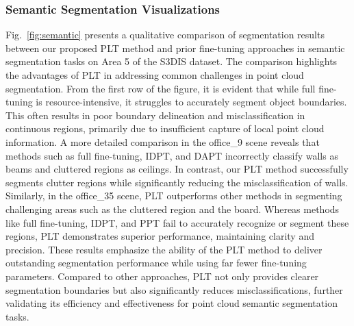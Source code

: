 \subsubsection{Semantic Segmentation Visualizations}  
Fig.~\ref{fig:semantic} presents a qualitative comparison of segmentation results between our proposed PLT method and prior fine-tuning approaches in semantic segmentation tasks on Area 5 of the S3DIS dataset. The comparison highlights the advantages of PLT in addressing common challenges in point cloud segmentation. From the first row of the figure, it is evident that while full fine-tuning is resource-intensive, it struggles to accurately segment object boundaries. This often results in poor boundary delineation and misclassification in continuous regions, primarily due to insufficient capture of local point cloud information. A more detailed comparison in the office\_9 scene reveals that methods such as full fine-tuning, IDPT, and DAPT incorrectly classify walls as beams and cluttered regions as ceilings. In contrast, our PLT method successfully segments clutter regions while significantly reducing the misclassification of walls. Similarly, in the office\_35 scene, PLT outperforms other methods in segmenting challenging areas such as the cluttered region and the board. Whereas methods like full fine-tuning, IDPT, and PPT fail to accurately recognize or segment these regions, PLT demonstrates superior performance, maintaining clarity and precision. These results emphasize the ability of the PLT method to deliver outstanding segmentation performance while using far fewer fine-tuning parameters. Compared to other approaches, PLT not only provides clearer segmentation boundaries but also significantly reduces misclassifications, further validating its efficiency and effectiveness for point cloud semantic segmentation tasks.













